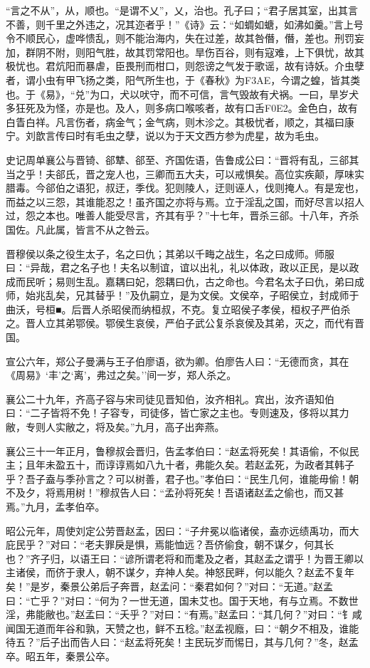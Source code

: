 \documentclass[]{article}
\begin{document}
``言之不从''，从，顺也。``是谓不乂''，乂，治也。孔子曰；``君子居其室，出其言不善，则千里之外违之，况其迩者乎！''《诗》云：``如蜩如螗，如沸如羹。''言上号令不顺民心，虚哗愦乱，则不能治海内，失在过差，故其咎僭，僭，差也。刑罚妄加，群阴不附，则阳气胜，故其罚常阳也。旱伤百谷，则有寇难，上下俱忧，故其极忧也。君炕阳而暴虐，臣畏刑而柑口，则怨谤之气发于歌谣，故有诗妖。介虫孽者，谓小虫有甲飞扬之类，阳气所生也，于《春秋》为F3AE，今谓之蝗，皆其类也。于《易》，``兑''为口，犬以吠守，而不可信，言气毁故有犬祸。一曰，旱岁犬多狂死及为怪，亦是也。及人，则多病口喉咳者，故有口舌F0E2。金色白，故有白眚白祥。凡言伤者，病金气；金气病，则木沴之。其极忧者，顺之，其福曰康宁。刘歆言传曰时有毛虫之孽，说以为于天文西方参为虎星，故为毛虫。

史记周单襄公与晋锜、郤犨、郤至、齐国佐语，告鲁成公曰：``晋将有乱，三郤其当之乎！夫郤氏，晋之宠人也，三卿而五大夫，可以戒惧矣。高位实疾颠，厚味实腊毒。今郤伯之语犯，叔迂，季伐。犯则陵人，迂则诬人，伐则掩人。有是宠也，而益之以三怨，其谁能忍之！虽齐国之亦将与焉。立于淫乱之国，而好尽言以招人过，怨之本也。唯善人能受尽言，齐其有乎？''十七年，晋杀三郤。十八年，齐杀国佐。凡此属，皆言不从之咎云。

晋穆侯以条之役生太子，名之曰仇；其弟以千畮之战生，名之曰成师。师服曰：``异哉，君之名子也！夫名以制谊，谊以出礼，礼以体政，政以正民，是以政成而民听；易则生乱。嘉耦曰妃，怨耦曰仇，古之命也。今君名太子曰仇，弟曰成师，始兆乱矣，兄其替乎！''及仇嗣立，是为文侯。文侯卒，子昭侯立，封成师于曲沃，号桓■。后晋人杀昭侯而纳桓叔，不克。复立昭侯子孝侯，桓权子严伯杀之。晋人立其弟鄂侯。鄂侯生哀侯，严伯子武公复杀哀侯及其弟，灭之，而代有晋国。

宣公六年，郑公子曼满与王子伯廖语，欲为卿。伯廖告人曰：``无德而贪，其在《周易》`丰'之`离'，弗过之矣。''间一岁，郑人杀之。

襄公二十九年，齐高子容与宋司徒见晋知伯，汝齐相礼。宾出，汝齐语知伯曰：``二子皆将不免！子容专，司徒侈，皆亡家之主也。专则速及，侈将以其力敝，专则人实敝之，将及矣。''九月，高子出奔燕。

襄公三十一年正月，鲁穆叔会晋归，告孟孝伯曰：``赵孟将死矣！其语偷，不似民主；且年未盈五十，而谆谆焉如八九十者，弗能久矣。若赵孟死，为政者其韩子乎？吾子盍与季孙言之？可以树善，君子也。''孝伯曰：``民生几何，谁能毋偷！朝不及夕，将焉用树！''穆叔告人曰：``孟孙将死矣！吾语诸赵孟之偷也，而又甚焉。''九月，孟孝伯卒。

昭公元年，周使刘定公劳晋赵孟，因曰：``子弁冕以临诸侯，盍亦远绩禹功，而大庇民乎？''对曰：``老夫罪戾是惧，焉能恤远？吾侪偷食，朝不谋夕，何其长也？''齐子归，以语王曰：``谚所谓老将和而耄及之者，其赵孟之谓乎！为晋王卿以主诸侯，而侪于隶人，朝不谋夕，弃神人矣。神怒民畔，何以能久？赵孟不复年矣！''是岁，秦景公弟后子奔晋，赵孟问：``秦君如何？''对曰：``无道。''赵孟曰：``亡乎？''对曰：``何为？一世无道，国未艾也。国于天地，有与立焉。不数世淫，弗能敝也。''赵孟曰：``夭乎？''对曰：``有焉。''赵孟曰：``其几何？''对曰：``钅咸闻国无道而年谷和孰，天赞之也，鲜不五稔。''赵孟视廕，曰：``朝夕不相及，谁能待五？''后子出而告人曰：``赵孟将死矣！主民玩岁而惕日，其与几何？''冬，赵孟卒。昭五年，秦景公卒。
\end{document}
